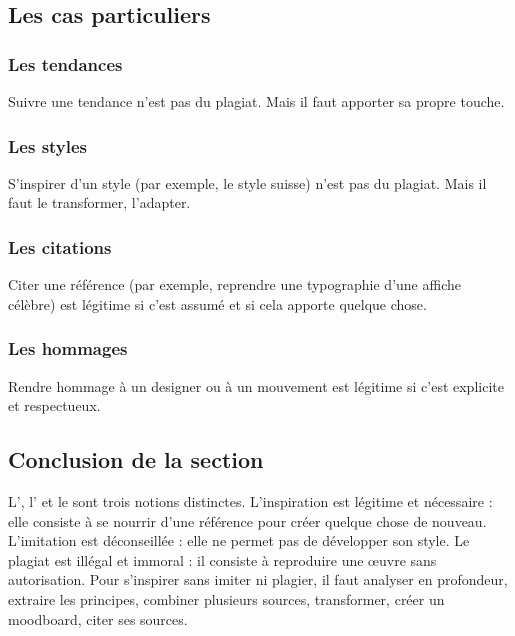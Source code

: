 \subsection{Les cas particuliers}

\subsubsection{Les tendances}

Suivre une tendance n'est pas du plagiat. Mais il faut apporter sa propre touche.

\subsubsection{Les styles}

S'inspirer d'un style (par exemple, le style suisse) n'est pas du plagiat. Mais il faut le transformer, l'adapter.

\subsubsection{Les citations}

Citer une référence (par exemple, reprendre une typographie d'une affiche célèbre) est légitime si c'est assumé et si cela apporte quelque chose.

\subsubsection{Les hommages}

Rendre hommage à un designer ou à un mouvement est légitime si c'est explicite et respectueux.

\subsection*{Conclusion de la section}

\begin{retenir}
L', l' et le  sont trois notions distinctes. L'inspiration est légitime et nécessaire : elle consiste à se nourrir d'une référence pour créer quelque chose de nouveau. L'imitation est déconseillée : elle ne permet pas de développer son style. Le plagiat est illégal et immoral : il consiste à reproduire une œuvre sans autorisation. Pour s'inspirer sans imiter ni plagier, il faut analyser en profondeur, extraire les principes, combiner plusieurs sources, transformer, créer un moodboard, citer ses sources.
\end{retenir}

